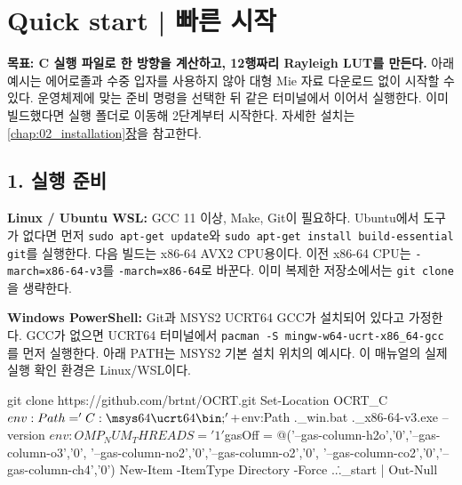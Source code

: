 \chapter*{Quick start | 빠른 시작}
\label{chap:quick_start}
\begingroup
\setlength{\parskip}{3pt}
\textbf{목표: C 실행 파일로 한 방향을 계산하고, 12행짜리 Rayleigh LUT를 만든다.}
아래 예시는 에어로졸과 수중 입자를 사용하지 않아 대형 Mie 자료 다운로드 없이 시작할 수 있다. 운영체제에 맞는 준비 명령을 선택한 뒤 같은 터미널에서 이어서 실행한다. 이미 빌드했다면 실행 폴더로 이동해 2단계부터 시작한다. 자세한 설치는 \hyperref[chap:02_installation]{\ref*{chap:02_installation}장}을 참고한다.

\section*{1. 실행 준비}
\textbf{Linux / Ubuntu WSL:} GCC 11 이상, Make, Git이 필요하다. Ubuntu에서 도구가 없다면 먼저 \texttt{sudo apt-get update}와 \texttt{sudo apt-get install build-essential git}를 실행한다. 다음 빌드는 x86-64 AVX2 CPU용이다. 이전 x86-64 CPU는 \texttt{-march=x86-64-v3}를 \texttt{-march=x86-64}로 바꾼다. 이미 복제한 저장소에서는 \texttt{git clone}을 생략한다.


\textbf{Windows PowerShell:} Git과 MSYS2 UCRT64 GCC가 설치되어 있다고 가정한다. GCC가 없으면 UCRT64 터미널에서 \texttt{pacman -S mingw-w64-ucrt-x86\_64-gcc}를 먼저 실행한다. 아래 PATH는 MSYS2 기본 설치 위치의 예시다. 이 매뉴얼의 실제 실행 확인 환경은 Linux/WSL이다.

\begin{ManualCode}
git clone https://github.com/brtnt/OCRT.git
Set-Location OCRT\code\OCRT_C
$env:Path = 'C:\bin;' + $env:Path
.\build_win.bat
.\build\ocrt_x86-64-v3.exe --version
$env:OMP_NUM_THREADS = '1'
$gasOff = @('--gas-column-h2o','0','--gas-column-o3','0',
  '--gas-column-no2','0','--gas-column-o2','0',
  '--gas-column-co2','0','--gas-column-ch4','0')
New-Item -ItemType Directory -Force ..\..\task\quick_start | Out-Null
\end{ManualCode}

